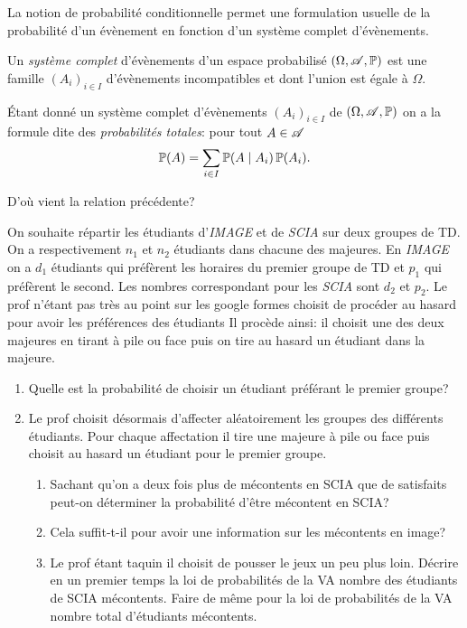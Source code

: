 \documentclass[11pt, a4paper]{article}
\begin{document}
La notion de probabilité conditionnelle permet une formulation usuelle
de la probabilité d'un évènement en fonction d'un système complet
d'évènements.
\begin{defn}
  Un \emph{système complet} d'évènements d'un espace probabilisé
  $(\Omega, \mathscr{A}, \operatorname{\mathbb{P}})$ est une famille $(A_i)_{i \in I}$
  d'évènements incompatibles et dont l'union est égale à
  $\Omega$.
\end{defn}
\begin{prop}
  Étant donné un système complet d'évènements $(A_i)_{i \in I}$ de
  $(\Omega, \mathscr{A}, \operatorname{\mathbb{P}})$ on a la formule dite des \emph{probabilités
    totales}: pour tout $A \in \mathscr{A}$
  \[
    \operatorname{\mathbb{P}}(A) = \sum_{i \in I} \operatorname{\mathbb{P}}(A \mid A_i)\operatorname{\mathbb{P}}(A_i).
  \]
\end{prop}
\begin{question}
  D'où vient la relation précédente?
\end{question}
\begin{question}
  On souhaite répartir les étudiants d'\textit{IMAGE} et de
  \textit{SCIA} sur deux groupes de TD. On a respectivement $n_1$ et
  $n_2$ étudiants dans chacune des majeures. En \textit{IMAGE} on a
  $d_1$ étudiants qui préfèrent les horaires du premier groupe de TD
  et $p_1$ qui préfèrent le second. Les nombres correspondant pour les
  \textit{SCIA} sont $d_2$ et $p_2$. Le prof n'étant pas très au point
  sur les google formes choisit de procéder au hasard pour avoir les
  préférences des étudiants Il procède ainsi: il choisit une des deux
  majeures en tirant à pile ou face puis on tire au hasard un étudiant
  dans la majeure.
  \begin{enumerate}
  \item Quelle est la probabilité de choisir un étudiant préférant le
    premier groupe?
  \item Le prof choisit désormais d'affecter aléatoirement les groupes
    des différents étudiants. Pour chaque affectation il tire une
    majeure à pile ou face puis choisit au hasard un étudiant pour le
    premier groupe.
    \begin{enumerate}
    \item Sachant qu'on a deux fois plus de mécontents en SCIA que de
      satisfaits peut-on déterminer la probabilité d'être mécontent en
      SCIA?
    \item Cela suffit-t-il pour avoir une information sur les mécontents
      en image?
    \item Le prof étant taquin il choisit de pousser le jeux un peu
      plus loin. Décrire en un premier temps la loi de probabilités de
      la VA nombre des étudiants de SCIA mécontents. Faire de même
      pour la loi de probabilités de la VA nombre total d'étudiants
      mécontents.
    \end{enumerate}
  \end{enumerate}
\end{question}
\end{document}
